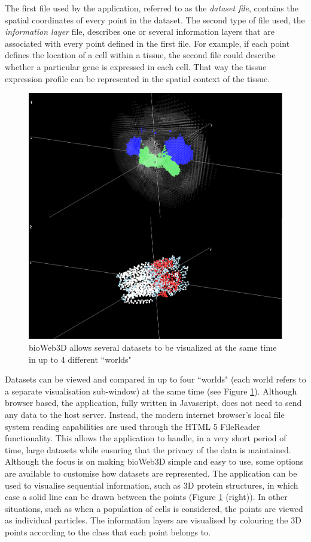 The first file used by the application, referred to as the \emph{dataset file}, contains the spatial coordinates of every point in the dataset. The second type of file used, the \emph{information layer} file, describes one or several information layers that are associated with every point defined in the first file. For example, if each point defines the location of a cell within a tissue, the second file could describe whether a particular gene is expressed in each cell. That way the tissue expression profile can be represented in the spatial context of the tissue.\\

\begin{figure}[bth]
\begin{center}
  \includegraphics[width=0.8\linewidth]{gfx/chapter3/two_worlds.png}
\end{center}
  \caption{bioWeb3D allows several datasets to be visualized at the same time in up to 4 different ``worlds"}
  \label{fig:2worlds}
\end{figure}

Datasets can be viewed and compared in up to four ``worlds" (each world refers to a separate visualisation sub-window) at the same time (see Figure \ref{fig:2worlds}). Although browser based, the application, fully written in Javascript, does not need to send any data to the host server. Instead, the modern internet browser's local file system reading capabilities are used through the HTML 5 FileReader functionality. This allows the application to handle, in a very short period of time, large datasets while ensuring that the privacy of the data is maintained.\\
Although the focus is on making bioWeb3D simple and easy to use, some options are available to customise how datasets are represented. The application can be used to visualise sequential information, such as 3D protein structures, in which case a solid line can be drawn between the points (Figure \ref{fig:2worlds} (right)). In other situations, such as when a population of cells is considered, the points are viewed as individual particles. The information layers are visualised by colouring the 3D points according to the class that each point belongs to. \\

